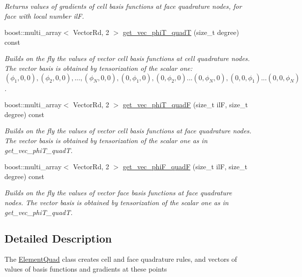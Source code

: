 \begin{DoxyCompactItemize}
\begin{DoxyCompactList}\small\item\em Returns values of gradients of cell basis functions at face quadrature nodes, for face with local number ilF. \end{DoxyCompactList}\item 
boost\+::multi\+\_\+array$<$ Vector\+Rd, 2 $>$ \hyperlink{classHArDCore3D_1_1ElementQuad_a3c549d43c0a5171d0c14f6b56ffc843d}{get\+\_\+vec\+\_\+phi\+T\+\_\+quadT} (size\+\_\+t degree) const
\begin{DoxyCompactList}\small\item\em Builds on the fly the values of vector cell basis functions at cell quadrature nodes. The vector basis is obtained by tensorization of the scalar one\+: $(\phi_1,0,0), (\phi_2,0,0), ..., (\phi_N,0,0), (0,\phi_1,0), (0,\phi_2,0) ... (0,\phi_N,0), (0,0,\phi_1) ... (0,0,\phi_N)$. \end{DoxyCompactList}\item 
boost\+::multi\+\_\+array$<$ Vector\+Rd, 2 $>$ \hyperlink{classHArDCore3D_1_1ElementQuad_ad470965a0f66f62c1ffed045e2dd49fc}{get\+\_\+vec\+\_\+phi\+T\+\_\+quadF} (size\+\_\+t ilF, size\+\_\+t degree) const
\begin{DoxyCompactList}\small\item\em Builds on the fly the values of vector cell basis functions at face quadrature nodes. The vector basis is obtained by tensorization of the scalar one as in get\+\_\+vec\+\_\+phi\+T\+\_\+quadT. \end{DoxyCompactList}\item 
boost\+::multi\+\_\+array$<$ Vector\+Rd, 2 $>$ \hyperlink{classHArDCore3D_1_1ElementQuad_a862a7cc1c7f5e62bcb26c5a2a14bb4ea}{get\+\_\+vec\+\_\+phi\+F\+\_\+quadF} (size\+\_\+t ilF, size\+\_\+t degree) const
\begin{DoxyCompactList}\small\item\em Builds on the fly the values of vector face basis functions at face quadrature nodes. The vector basis is obtained by tensorization of the scalar one as in get\+\_\+vec\+\_\+phi\+T\+\_\+quadT. \end{DoxyCompactList}\end{DoxyCompactItemize}


\subsection{Detailed Description}
The \hyperlink{classHArDCore3D_1_1ElementQuad}{Element\+Quad} class creates cell and face quadrature rules, and vectors of values of basis functions and gradients at these points 

